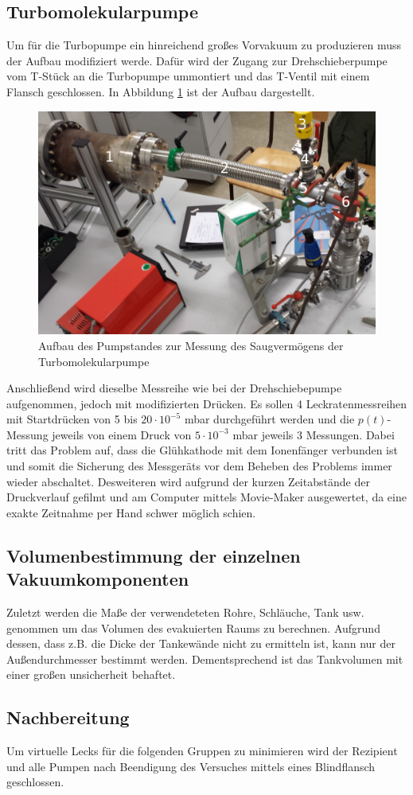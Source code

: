 \subsection{Turbomolekularpumpe}
Um für die Turbopumpe ein hinreichend großes Vorvakuum zu produzieren muss der Aufbau modifiziert werde. Dafür wird der Zugang zur Drehschieberpumpe vom T-Stück an die Turbopumpe ummontiert und das T-Ventil mit einem Flansch geschlossen. In Abbildung \ref{fig:Turbo} ist der Aufbau dargestellt.
\begin{figure}[htpb]
  \centering
  \includegraphics[width=\textwidth]{picture/Aufgabe2.jpg}
  \caption{Aufbau des Pumpstandes zur Messung des Saugvermögens der Turbomolekularpumpe}
  \label{fig:Turbo}
\end{figure}
Anschließend wird dieselbe Messreihe wie bei der Drehschiebepumpe aufgenommen, jedoch mit modifizierten Drücken. Es sollen 4 Leckratenmessreihen mit Startdrücken von 5 bis $20 \cdot 10^{-5}$ mbar durchgeführt werden und die $p(t)$-Messung jeweils von einem Druck von $5 \cdot 10^{-3}$ mbar jeweils 3 Messungen. Dabei tritt das Problem auf, dass die Glühkathode mit dem Ionenfänger verbunden ist und somit die Sicherung des Messgeräts vor dem Beheben des Problems immer wieder abschaltet. Desweiteren wird aufgrund der kurzen Zeitabstände der Druckverlauf gefilmt und am Computer mittels Movie-Maker ausgewertet, da eine exakte Zeitnahme per Hand schwer möglich schien.

\subsection{Volumenbestimmung der einzelnen Vakuumkomponenten}
Zuletzt werden die Maße der verwendeteten Rohre, Schläuche, Tank usw. genommen um das Volumen des evakuierten Raums zu berechnen. Aufgrund dessen, dass z.B. die Dicke der Tankewände nicht zu ermitteln ist, kann nur der Außendurchmesser bestimmt werden. Dementsprechend ist das Tankvolumen mit einer großen unsicherheit behaftet. 
\subsection{Nachbereitung}
Um virtuelle Lecks für die folgenden Gruppen zu minimieren wird der Rezipient und alle Pumpen nach Beendigung des Versuches mittels eines Blindflansch geschlossen.
